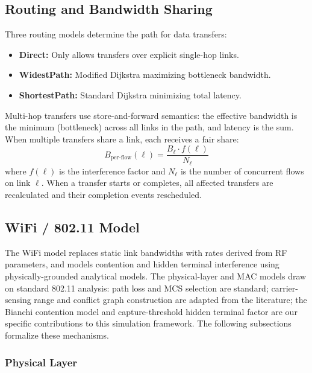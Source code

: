 \documentclass[conference]{IEEEtran}
\begin{document}
\subsection{Routing and Bandwidth Sharing}

Three routing models determine the path for data transfers:

\begin{itemize}[itemsep=1pt,leftmargin=*]
\item \textbf{Direct:} Only allows transfers over explicit single-hop links.
\item \textbf{WidestPath:} Modified Dijkstra maximizing bottleneck bandwidth.
\item \textbf{ShortestPath:} Standard Dijkstra minimizing total latency.
\end{itemize}

Multi-hop transfers use store-and-forward semantics: the effective bandwidth
is the minimum (bottleneck) across all links in the path, and latency is the
sum.  When multiple transfers share a link, each receives a fair share:
\begin{equation}
B_\text{per-flow}(\ell) = \frac{B_\ell \cdot f(\ell)}{N_\ell}
\label{eq:fair_share}
\end{equation}
where $f(\ell)$ is the interference factor and $N_\ell$ is the number of
concurrent flows on link $\ell$.  When a transfer starts or completes, all
affected transfers are recalculated and their completion events rescheduled.

\subsection{WiFi / 802.11 Model}
\label{sec:wifi}

The WiFi model replaces static link bandwidths with rates derived from RF
parameters, and models contention and hidden terminal interference using
physically-grounded analytical models.  The physical-layer and MAC models
draw on standard 802.11 analysis: path loss and MCS selection are standard;
carrier-sensing range and conflict graph construction are adapted from the
literature; the Bianchi contention model and capture-threshold hidden
terminal factor are our specific contributions to this simulation framework.
The following subsections formalize these mechanisms.

\subsubsection{Physical Layer}
\end{document}
